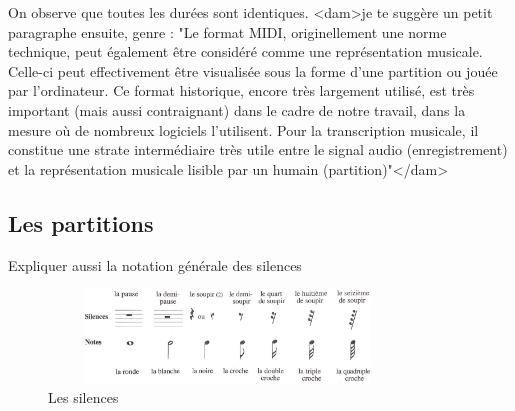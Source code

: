 On observe que toutes les durées sont identiques.
<dam>je te suggère un petit paragraphe ensuite, genre :
"Le format MIDI, originellement une norme technique, peut également être
considéré comme une représentation musicale. Celle-ci peut effectivement être
visualisée sous la forme d'une partition ou jouée par l'ordinateur. Ce format
historique, encore très largement utilisé, est très important (mais aussi
contraignant) dans le cadre de notre travail, dans la mesure où de nombreux
logiciels l'utilisent. Pour la transcription musicale, il constitue une strate
intermédiaire très utile entre le signal audio (enregistrement) et la
représentation musicale lisible par un humain (partition)"</dam>
\subsection*{Les partitions}

Expliquer aussi la notation générale des silences
\begin{figure}[h]
	\centering
	\includegraphics[height=25mm, width=95mm]{z_images/3_methodes/0_notation_de_la_batterie/4_silences.png}
	\caption{Les silences}
	\label{silences}
\end{figure}



